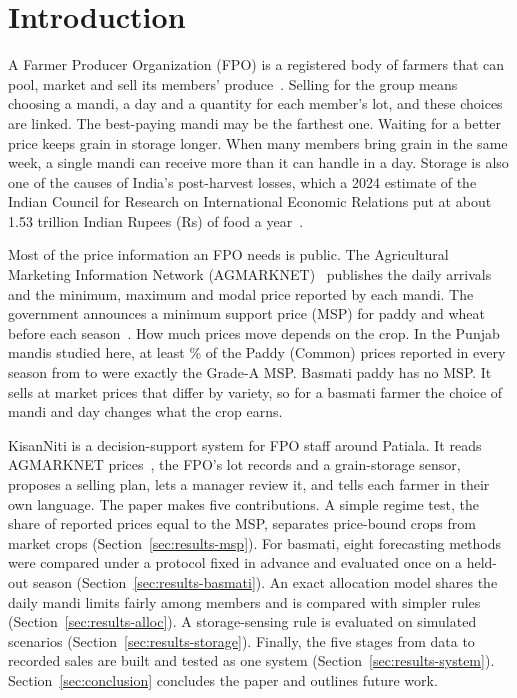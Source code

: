 \section{Introduction}
\label{sec:intro}

A Farmer Producer Organization (FPO) is a registered body of farmers that can pool, market and sell its members' produce~\cite{sfac}.
Selling for the group means choosing a mandi, a day and a quantity for each member's lot, and these choices are linked. The
best-paying mandi may be the farthest one. Waiting for a better price keeps grain in storage longer. When many members bring grain in
the same week, a single mandi can receive more than it can handle in a day. Storage is also one of the causes of India's post-harvest
losses, which a 2024 estimate of the Indian Council for Research on International Economic Relations put at about 1.53 trillion Indian
Rupees (Rs) of food a year~\cite{icrier}.

Most of the price information an FPO needs is public. The Agricultural Marketing Information Network (AGMARKNET)~\cite{agmarknet}
publishes the daily arrivals and the minimum, maximum and modal price reported by each mandi. The government announces a minimum support
price (MSP) for paddy and wheat before each season~\cite{msp1}\cite{msp2}. How much prices move depends on the crop. In the
 Punjab mandis studied here, at least \% of the Paddy (Common) prices reported in every season from
 to  were exactly the Grade-A MSP. Basmati paddy has no MSP. It sells at market prices that differ by
variety, so for a basmati farmer the choice of mandi and day changes what the crop earns.

KisanNiti is a decision-support system for FPO staff around Patiala. It reads AGMARKNET prices~\cite{agmarknet}, the FPO's lot records
and a grain-storage sensor, proposes a selling plan, lets a manager review it, and tells each farmer in their own language. The paper
makes five contributions. A simple regime test, the share of reported prices equal to the MSP, separates price-bound crops from market
crops (Section~\ref{sec:results-msp}). For basmati, eight forecasting methods were compared under a protocol fixed in advance and
evaluated once on a held-out season (Section~\ref{sec:results-basmati}). An exact allocation model shares the daily mandi limits fairly
among members and is compared with simpler rules (Section~\ref{sec:results-alloc}). A storage-sensing rule is evaluated on simulated
scenarios (Section~\ref{sec:results-storage}). Finally, the five stages from data to recorded sales are built and tested as one system
(Section~\ref{sec:results-system}). Section~\ref{sec:conclusion} concludes the paper and outlines future work.
